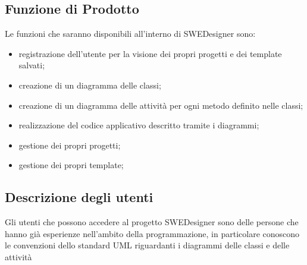 \subsection{Funzione di Prodotto}
Le funzioni che saranno disponibili all'interno di SWEDesigner sono:
\begin{itemize}
\item registrazione dell'utente per la visione dei propri progetti e dei template salvati; \\
\item creazione di un diagramma delle classi; \\
\item creazione di un diagramma delle attività per ogni metodo definito nelle classi;
\item realizzazione del codice applicativo descritto tramite i diagrammi;
\item gestione dei propri progetti;
\item gestione dei propri template;
\end{itemize}

\subsection{Descrizione degli utenti}
Gli utenti che possono accedere al progetto SWEDesigner sono delle persone che hanno già esperienze nell'ambito della programmazione, in particolare conoscono le convenzioni dello standard UML riguardanti i diagrammi delle classi e delle attività 